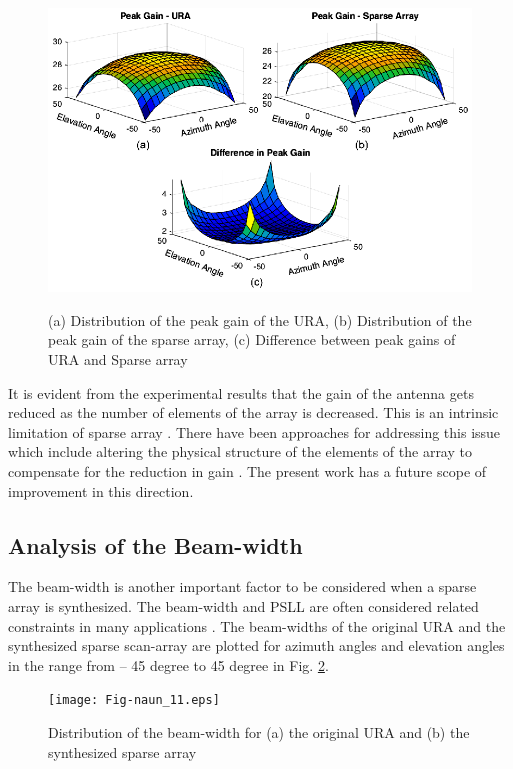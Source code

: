 \begin{figure}
  \centering
  \includegraphics[width=0.95\linewidth]{Fig-naun_10.eps}\\
  \caption{(a) Distribution of the peak gain of the URA, (b) Distribution of the peak gain of the sparse array, (c) Difference between peak gains of URA and Sparse array} \label{fig_5_10}
\end{figure}

It is evident from the experimental results that the gain of the antenna gets reduced as the number of elements of the array is decreased. This is an intrinsic limitation of sparse array \cite{sparse_rect_planar}. There have been approaches for addressing this issue which include altering the physical structure of the elements of the array to compensate for the reduction in gain \cite{compact_sparse_array_satcom}. The present work has a future scope of improvement in this direction.

\subsection{Analysis of the Beam-width}
The beam-width is another important factor to be considered when a sparse array is synthesized. The beam-width and PSLL are often considered related constraints in many applications \cite{arrayTradeoffs}. The beam-widths of the original URA and the synthesized sparse scan-array are plotted for azimuth angles and elevation angles in the range from -- 45 degree to 45 degree in Fig. \ref{fig_5_11}.

\begin{figure}
  \centering
  \texttt{[image: Fig-naun\_11.eps]}\\
  \caption{Distribution of the beam-width for (a) the original URA and (b) the synthesized sparse array} \label{fig_5_11}
\end{figure}


